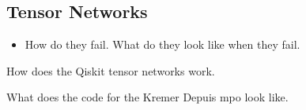 \subsection{Tensor Networks}

\begin{itemize}
    \item How do they fail. What do they look like when they fail.
\end{itemize}

How does the Qiskit tensor networks work.

What does the code for the Kremer Depuis mpo look like.







